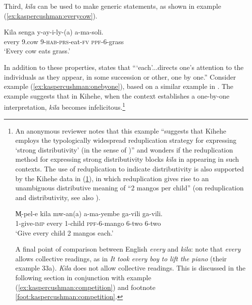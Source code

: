 \documentclass[output=paper,modfonts,nonflat]{langsci/langscibook}
\begin{document}
Third, \emph{kila} can be used to make generic statements, as shown in example (\ref{ex:kaspercushman:everycow}).

\begin{exe}


\ex 
\gll Kila senga y-ay-i-ly-(a) a-ma-soli. \label{ex:kaspercushman:everycow}\\
every 9.cow 9-\textsc{hab}-\textsc{prs}-eat-\textsc{fv} \textsc{ppf}-6-grass \\
\glt `Every cow eats grass.' 

\end{exe}


In addition to these properties, \cite[150]{vendler62} states that ```each'...directs one's attention to the individuals as they appear, in some succession or other, one by one.''  Consider example (\ref{ex:kaspercushman:onebyone}), based on a similar example in \cite[150]{vendler62}. The example suggests that in Kihehe, when the context establishes a one-by-one interpretation, \textit{kila} becomes infelicitous.\footnote{An anonymous reviewer notes that this example ``suggests that Kihehe employs the typologically widespread reduplication strategy for expressing `strong distributivity' (in the sense of \citealt{beghelli97})'' and wonders if the reduplication method for expressing strong distributivity blocks \textit{kila} in appearing in such contexts. The use of reduplication to indicate distributivity is also supported by the Kihehe data in (\ref{mangos}), in which reduplication gives rise to an unambiguous distributive meaning of ``2 mangos per child'' (on reduplication and distributivity, see also \citealt{balusu13}). 
\begin{exe}
\ex \label{mangos} 
\gll M̩-pel-e kila mw-an(a) a-ma-yembe ga-vili ga-vili. \\
1-give-\textsc{imp} every 1-child \textsc{ppf}-6-mango 6-two 6-two \\
\glt `Give every child 2 mangos each.' \\
\end{exe}

A final point of comparison between English \textit{every} and \textit{kila}: \cite[98]{beghelli97} note that \textit{every} allows collective readings, as in \textit{It took every boy to lift the piano} (their example 33a). \textit{Kila} does not allow collective readings. This is discussed in the following section in conjunction with example (\ref{ex:kaspercushman:competition}) and footnote \ref{foot:kaspercushman:competition}.}
\end{document}
